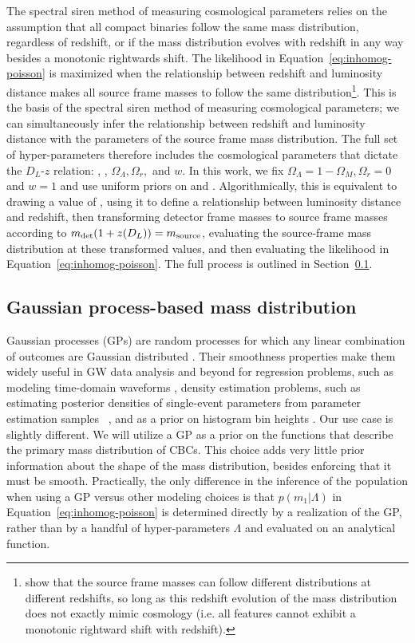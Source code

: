 \documentclass[]{aastex631}
\begin{document}
The spectral siren method of measuring cosmological parameters relies on the assumption that all compact binaries follow the same mass distribution, regardless of redshift, or if the mass distribution evolves with redshift in any way besides a monotonic rightwards shift.
The likelihood in Equation~\ref{eq:inhomog-poisson} is maximized when the relationship between redshift and luminosity distance makes all source frame masses to follow the same distribution\footnote{\citet{ezquiaga_spectral_2022} show that the source frame masses can follow different distributions at different redshifts, so long as this redshift evolution of the mass distribution does not exactly mimic cosmology (i.e. all features cannot exhibit a monotonic rightward shift with redshift).}.
This is the basis of the spectral siren method of measuring cosmological parameters; we can simultaneously infer the relationship between redshift and luminosity distance with the parameters of the source frame mass distribution.
The full set of hyper-parameters therefore includes the cosmological parameters that dictate the $D_L$-$z$ relation: \Ho, \Omm, $\Omega_\Lambda, \Omega_r,$ and $w$.
In this work, we fix $\Omega_\Lambda=1-\Omega_M, \Omega_r=0$ and $w=1$ and use uniform priors on \Ho{} and \Omm{}.
Algorithmically, this is equivalent to drawing a value of \Ho, using it to define a relationship between luminosity distance and redshift, then transforming detector frame masses to source frame masses according to $m_{\det} (1+z(D_L)) = m_{\text{source}}$, evaluating the source-frame mass distribution at these transformed values, and then evaluating the likelihood in Equation~\ref{eq:inhomog-poisson}.
The full process is outlined in Section~\ref{sec:model}.


\subsection{Gaussian process-based mass distribution}
\label{sec:model}
Gaussian processes (GPs) are random processes for which any linear combination of outcomes are Gaussian distributed \citep{rasmussen_gaussian_2006}.
Their smoothness properties make them widely useful in GW data analysis and beyond for regression problems, such as modeling time-domain waveforms \citep{zoheyr, huerta}, density estimation problems, such as estimating posterior densities of single-event parameters from parameter estimation samples ~\citep{dangelo}, and as a prior on histogram bin heights \citep{ray_2023,li_flexible_2021}.
Our use case is slightly different.
We will utilize a GP as a prior on the functions that describe the primary mass distribution of CBCs.
This choice adds very little prior information about the shape of the mass distribution, besides enforcing that it must be smooth.
Practically, the only difference in the inference of the population when using a GP versus other modeling choices is that $p(m_1|\Lambda)$ in Equation~\ref{eq:inhomog-poisson} is determined directly by a realization of the GP, rather than by a handful of hyper-parameters $\Lambda$ and evaluated on an analytical function.
\end{document}
